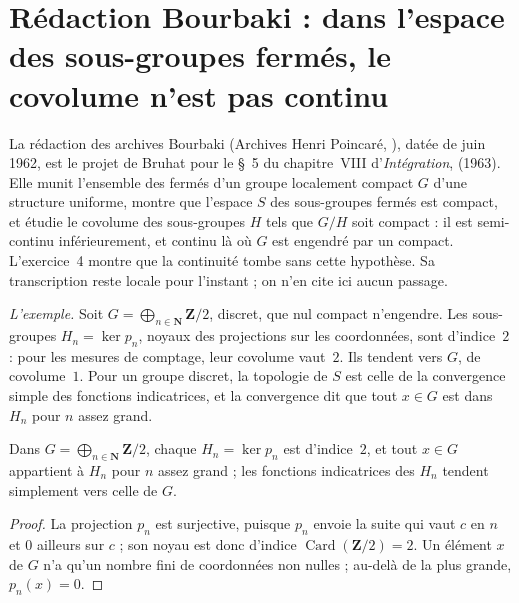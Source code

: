\section[Rédaction Bourbaki \redac{384} : le covolume n'est pas continu]{Rédaction Bourbaki  : dans l'espace des sous-groupes fermés, le covolume n'est pas continu\protect{}}\label{sec:bourbaki-384}

La rédaction  des archives Bourbaki (Archives Henri Poincaré, ), datée de juin 1962, est le projet de Bruhat pour le §~5 du chapitre~VIII d'\emph{Intégration},  (1963). Elle munit l'ensemble des fermés d'un groupe localement compact $G$ d'une structure uniforme, montre que l'espace $S$ des sous-groupes fermés est compact, et étudie le covolume des sous-groupes $H$ tels que $G/H$ soit compact : il est semi-continu inférieurement, et continu là où $G$ est engendré par un compact. L'exercice~4 montre que la continuité tombe sans cette hypothèse. Sa transcription reste locale pour l'instant ; on n'en cite ici aucun passage.

\emph{L'exemple.} Soit $G = \bigoplus_{n \in \mathbf N} \mathbf Z/2$, discret, que nul compact n'engendre. Les sous-groupes $H_n = \ker p_n$, noyaux des projections sur les coordonnées, sont d'indice~$2$ : pour les mesures de comptage, leur covolume vaut~$2$. Ils tendent vers $G$, de covolume~$1$. Pour un groupe discret, la topologie de $S$ est celle de la convergence simple des fonctions indicatrices, et la convergence dit que tout $x \in G$ est dans $H_n$ pour $n$ assez grand.

\begin{encadre}
\begin{enonce}
Dans $G = \bigoplus_{n \in \mathbf N} \mathbf Z/2$, chaque $H_n = \ker p_n$ est d'indice~$2$, et tout $x \in G$ appartient à $H_n$ pour $n$ assez grand ; les fonctions indicatrices des $H_n$ tendent simplement vers celle de $G$.
\end{enonce}
\end{encadre}

\begin{proof}
La projection $p_n$ est surjective, puisque $p_n$ envoie la suite qui vaut $c$ en $n$ et $0$ ailleurs sur $c$ ; son noyau est donc d'indice $\operatorname{Card}(\mathbf Z/2) = 2$. Un élément $x$ de $G$ n'a qu'un nombre fini de coordonnées non nulles ; au-delà de la plus grande, $p_n(x) = 0$.
\end{proof}

